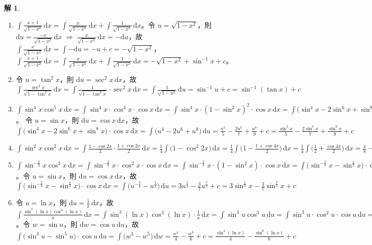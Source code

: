\documentclass[12pt]{extarticle}
\newcommand{\ds}{\displaystyle}
\newcommand{\ie}{\;\Longrightarrow\;}
\theoremstyle{definition}
\newtheorem*{sol}{解}
\begin{document}
\begin{sol}
\begin{enumerate}
    \item $\ds\int\frac{x + 1}{\sqrt{1 - x^2}}\,\text{d}x = \int\frac{x}{\sqrt{1 - x^2}}\,\text{d}x + \int\frac{1}{\sqrt{1 - x^2}}\,\text{d}x$。令 $\ds u = \sqrt{1 - x^2}$，則 $\ds\text{d}u = \frac{-x}{\sqrt{1 - x^2}}\,\text{d}x\ie \frac{x}{\sqrt{1 - x^2}}\,\text{d}x = -\text{d}u$，故 $\ds\int\frac{x}{\sqrt{1 - x^2}}\,\text{d}x = \int-\text{d}u = -u + c = -\sqrt{1 - x^2}$，$\ds\int\frac{x + 1}{\sqrt{1 - x^2}}\,\text{d}x = \int\frac{x}{\sqrt{1 - x^2}}\,\text{d}x + \int\frac{1}{\sqrt{1 - x^2}}\,\text{d}x = -\sqrt{1 - x^2} + \sin^{-1}x + c$。
    \item 令 $\ds u = \tan^2 x$，則 $\ds\text{d}u = \sec^2 x\,\text{d}x$，故 $\ds\int\frac{\sec^2 x}{\sqrt{1 - \tan^2 x}}\,\mathrm{d}x = \int\frac{1}{\sqrt{1 - \tan^2 x}}\cdot \sec^2 x\,\text{d}x = \int\frac{1}{\sqrt{1 - u^2}}\,\text{d}u = \sin^{-1} u + c = \sin^{-1}(\tan{x}) + c $
    \item $\ds\int\sin^4 x\cos^5 x\,\mathrm{d}x = \int\sin^4 x\cdot\cos^4 x\cdot\cos x\,\text{d}x = \int\sin^4x\cdot(1 - \sin^2 x)^2\cdot\cos x\,\text{d}x = \int\big(\sin^4x  - 2\sin^6x + \sin^8x\big)\cdot\cos x\,\text{d}x$。 令 $\ds u = \sin x$，則 $\ds\text{d}u = \cos x\,\text{d}x$，故 $\ds\int\big(\sin^4x  - 2\sin^6x + \sin^8x\big)\cdot\cos x\,\text{d}x = \int\big(u^4 - 2u^6 + u^8\big)\,\text{d}u = \frac{u^5}{5} - \frac{2u^7}{7} + \frac{u^9}{9} + c = \frac{\sin^5 x}{5} - \frac{2\sin^7 x}{7} + \frac{\sin^9 x}{9} + c$
    \item $\ds\int\sin^2 x\cos^2 x\,\mathrm{d}x = \int\frac{1 - \cos 2x}{2}\cdot\frac{1 + \cos 2x}{2}\,\text{d}x = \frac{1}{4}\int\big(1 - \cos^2{2x}\big)\,\text{d}x = \frac{1}{4}\int\big(1 - \frac{1 + \cos 4x}{2}\big)\,\text{d}x = \frac{1}{4}\int\big(\frac{1}{2} + \frac{\cos 4x}{2}\big)\,\text{d}x = \frac{x}{8} - \frac{\sin 4x}{32} + c$
    \item $\ds\int\sin^{-\frac{2}{3}} x\cos^3 x\,\mathrm{d}x = \int\sin^{-\frac{2}{3}} x\cdot\cos^2 x\cdot\cos x\,\mathrm{d}x = \int\sin^{-\frac{2}{3}} x\cdot(1 - \sin^2 x)\cdot\cos x\,\mathrm{d}x = \int\big(\sin^{-\frac{2}{3}} x - \sin^{\frac{4}{3}} x\big)\cdot\cos x\,\mathrm{d}x$。令 $u = \sin x$，則 $\ds\text{d}u = \cos x\,\text{d}x$，故 $\ds\int\big(\sin^{-\frac{2}{3}} x - \sin^{\frac{4}{3}} x\big)\cdot\cos x\,\mathrm{d}x = \int\big(u^{-\frac{2}{3}} - u^{\frac{4}{3}}\big)\,\text{d}u = 3u^{\frac{1}{3}} - \frac{3}{7}u^{\frac{7}{3}} + c = 3\sin^{\frac{1}{3}}x - \frac{3}{7}\sin^{\frac{7}{3}}x + c$
    \item 令 $\ds u = \ln x$，則 $\ds\text{d}u = \frac{1}{x}\,\text{d}x$，故 $\ds\int\frac{\sin^3(\ln x)\cos^3(\ln x)}{x}\,\mathrm{d}x = \int\sin^3(\ln x)\cos^3(\ln x)\cdot\frac{1}{x}\,\mathrm{d}x = \int\sin^3u\cos^3u\,\text{d}u = \int\sin^3u\cdot\cos^2u\cdot\cos u\,\text{d}u = \int\sin^3 u\big(1 - \sin^2 u\big)\cdot\cos u\,\text{d}u = \int\big(\sin^3u - \sin^5u\big)\cdot\cos u\,\text{d}u$。令 $\ds w = \sin u$，則 $\ds\text{d}w = \cos u\,\text{d}u$，故 $\ds\int\big(\sin^3u - \sin^5u\big)\cdot\cos u\,\text{d}u = \int\big(w^3 - w^5\big)\,\text{d}w = \frac{w^4}{4} - \frac{w^6}{6} + c = \frac{\sin^4(\ln x)}{4} - \frac{\sin^6(\ln x)}{6} + c$

\end{enumerate}
\end{sol}
\end{document}
